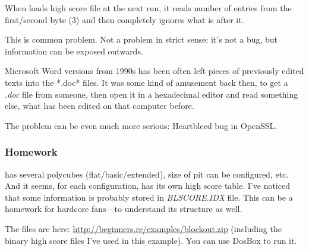 When  loads high score file at the next run, it reads number of entries from the first/second byte (3) and
then completely ignores what is after it.

This is common problem.
Not a problem in strict sense: it's not a bug, but information can be exposed outwards.

Microsoft Word versions from 1990s has been often left pieces of previously edited texts into the *.doc* files.
It was some kind of amusement back then, to get a \emph{.doc} file from someone,
then open it in a hexadecimal editor and read something else,
what has been edited on that computer before.

The problem can be even much more serious: Heartbleed bug
in OpenSSL.

\subsubsection{Homework}

 has several polycubes (flat/basic/extended), size of pit can be configured, etc.
And it seems, for each configuration,  has its own high score table.
I've noticed that some information is probably stored in \emph{BLSCORE.IDX} file.
This can be a homework for hardcore  fans---to understand its structure as well.

The  files are here: \url{http://beginners.re/examples/blockout.zip}
(including the binary high score files I've used in this example).
You can use DosBox to run it.

